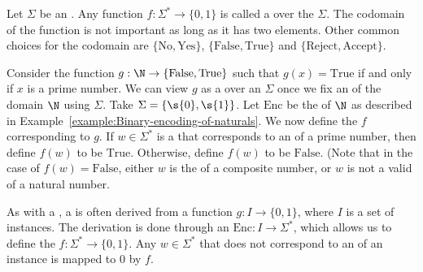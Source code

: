 \begin{flex}
\begin{definition} \label{definition:Decision-problem}
Let $\Sigma$ be an . Any function $f: \Sigma^* \to \{0,1\}$ is called a  over the  $\Sigma$. 
The codomain of the function is not important as long as it has two elements. 
Other common choices for the codomain are $\{\text{No}, \text{Yes}\}$, $\{\text{False}, \text{True}\}$ and $\{ \text{Reject}, \text{Accept}\}$.
\end{definition}

\begin{example} \label{example:Primality-testing-as-a-decision-problem}
Consider the function $g:\N \to \{\text{False}, \text{True}\}$ such that $g(x) = \text{True}$ if and only if $x$ is a prime number.
We can view $g$ as a  over an  $\Sigma$ once we fix an  of the domain $\N$ using $\Sigma$. 
Take $\Sigma = \{\s{0},\s{1}\}$. 
Let $\text{Enc}$ be the  of $\N$ as described in Example~\ref{example:Binary-encoding-of-naturals}. 
We now define the  $f$ corresponding to $g$. 
If $w \in \Sigma^*$ is a  that corresponds to an  of a prime number, then define $f(w)$ to be $\text{True}$. Otherwise, define $f(w)$ to be $\text{False}$. (Note that in the case of $f(w) = \text{False}$, either $w$ is the  of a composite number, or $w$ is not a valid  of a natural number.
\end{example}
\end{flex}


\begin{note} \label{note:Decision-problem-as-mapping-instances-to-0-or-1s}
As with a , a  is often derived from a function $g: I \to \{0,1\}$, where $I$ is a set of instances. 
The derivation is done through an  $\text{Enc}: I \to \Sigma^*$, which allows us to define the  $f: \Sigma^* \to \{0,1\}$. Any  $w \in \Sigma^*$ that does not correspond to an  of an instance is mapped to $0$ by $f$.
\end{note}

